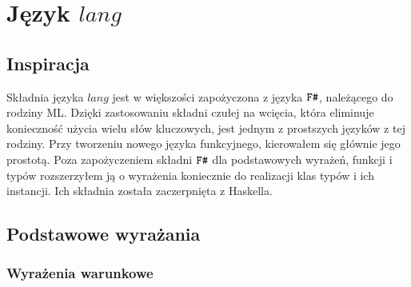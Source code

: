 \documentclass[declaration,shortabstract]{iithesis}
\begin{document}


\chapter{Język $lang$}

\section{Inspiracja}
Składnia języka $lang$ jest w większości zapożyczona z języka $\verb!F#!$, należącego
do rodziny ML. Dzięki zastosowaniu składni czułej na wcięcia, która eliminuje 
konieczność użycia wielu słów kluczowych, jest jednym z  prostszych języków z 
tej rodziny. Przy tworzeniu nowego języka funkcyjnego, kierowałem się głównie 
jego prostotą. Poza zapożyczeniem składni $\verb!F#!$ dla podstawowych wyrażeń, 
funkcji i typów rozszerzyłem ją o wyrażenia koniecznie do realizacji klas typów
i ich instancji. Ich składnia została zaczerpnięta z Haskella.

\section{Podstawowe wyrażania}

\subsection{Wyrażenia warunkowe}
\end{document}
